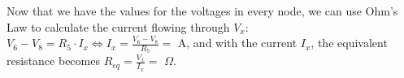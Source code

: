 Now that we have the values for the voltages in every node, we can use Ohm's Law to calculate the current flowing through $V_x$:
$V_6 - V_8 = R_5 \cdot I_x \iff I_x = \frac{V_6 - V_8}{R_5} = $ A,
and with the current $I_x$, the equivalent resistance becomes $R_{eq} = \frac{V_x}{I_x} =$ $\Omega$.
